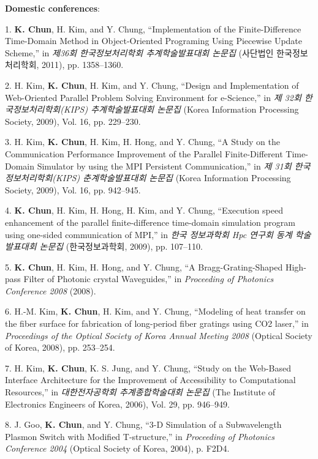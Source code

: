 \documentclass{gist}
\begin{document}
\begin{publication}{2cm}
\item[]\hspace{-\labelwidth}\hspace{-\labelsep}\textbf{Domestic conferences}:
\item[1.] \textbf{K. Chun}, H. Kim, and Y. Chung, ``Implementation of the Finite-Difference Time-Domain Method in Object-Oriented Programing Using Piecewise Update Scheme,'' in \textit{제36회 한국정보처리학회 추계학술발표대회 논문집} (사단법인 한국정보처리학회, 2011), pp. 1358–1360.
\item[2.] H. Kim, \textbf{K. Chun}, H. Kim, and Y. Chung, ``Design and Implementation of Web-Oriented Parallel Problem Solving Environment for e-Science,'' in \textit{제 32회 한국정보처리학회(KIPS) 추계학술발표대회 논문집} (Korea Information Processing Society, 2009), Vol. 16, pp. 229–230.
\item[3.] H. Kim, \textbf{K. Chun}, H. Kim, H. Hong, and Y. Chung, ``A Study on the Communication Performance Improvement of the Parallel Finite-Different Time-Domain Simulator by using the MPI Persistent Communication,'' in \textit{제 31회 한국정보처리학회(KIPS) 춘계학술발표대회 논문집} (Korea Information Processing Society, 2009), Vol. 16, pp. 942–945.
\item[4.] \textbf{K. Chun}, H. Kim, H. Hong, H. Kim, and Y. Chung, ``Execution speed enhancement of the parallel finite-difference time-domain simulation program using one-sided communication of MPI,'' in \textit{한국 정보과학회 Hpc 연구회 동계 학술 발표대회 논문집} (한국정보과학회, 2009), pp. 107–110.
\item[5.] \textbf{K. Chun}, H. Kim, H. Hong, and Y. Chung, ``A Bragg-Grating-Shaped High-pass Filter of Photonic crystal Waveguides,'' in \textit{Proceeding of Photonics Conference 2008} (2008).
\item[6.] H.-M. Kim, \textbf{K. Chun}, H. Kim, and Y. Chung, ``Modeling of heat transfer on the fiber surface for fabrication of long-period fiber gratings using CO2 laser,'' in \textit{Proceedings of the Optical Society of Korea Annual Meeting 2008} (Optical Society of Korea, 2008), pp. 253–254.
\item[7.] H. Kim, \textbf{K. Chun}, K. S. Jung, and Y. Chung, ``Study on the Web-Based Interface Architecture for the Improvement of Accessibility to Computational Resources,'' in \textit{대한전자공학회 추계종합학술대회 논문집} (The Institute of Electronics Engineers of Korea, 2006), Vol. 29, pp. 946–949.
\item[8.] J. Goo, \textbf{K. Chun}, and Y. Chung, ``3-D Simulation of a Subwavelength Plasmon Switch with Modified T-structure,'' in \textit{Proceeding of Photonics Conference 2004} (Optical Society of Korea, 2004), p. F2D4.

\end{publication}
\end{document}
